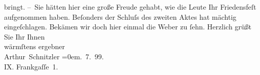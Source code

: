 \begin{ledgroupsized}[t]{13cm}
                        bringt.\pend
           \pstart
           {\pb}– Sie hätten hier eine große Freude gehabt, wie die Leute
                    Ihr Friedensfeſt aufgenommen haben. Beſonders
                    der Schluſs des zweiten Aktes hat mächtig eingeſchlagen. Bekämen wir doch hier
                    einmal die Weber zu ſehn.\pend
           \pstart
           Herzlich grüßt Sie Ihr Ihnen{\\[\baselineskip]}wärmſtens ergebner{\\[\baselineskip]}\spacefill\mbox{Arthur Schnitzler}\pend
           \leftskip=0em{}. 7. 99.{\\}IX. Frankgaſſe 1.
                \pend
           
         
         \endnumbering{}\end{ledgroupsized}  \newcommand{\dateiname}{L00943}\newcommand{\titel}{Arthur Schnitzler an Gerhart Hauptmann, 15. 7. 1899}\newcommand{\editorInnen}{ Martin Anton Müller und Gerd-Hermann Susen}
      